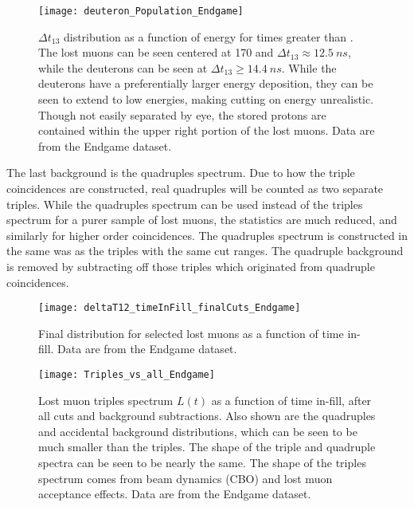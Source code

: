 \begin{figure}
    \centering
    \texttt{[image: deuteron\_Population\_Endgame]}
    \caption[Deuteron population at late times]{$\Delta t_{13}$ distribution as a function of energy for times greater than . The lost muons can be seen centered at 170 \MeV and $\Delta t_{13} \approx \SI{12.5}{ns}$, while the deuterons can be seen at $\Delta t_{13} \geq \SI{14.4}{ns}$. While the deuterons have a preferentially larger energy deposition, they can be seen to extend to low energies, making cutting on energy unrealistic. Though not easily separated by eye, the stored protons are contained within the upper right portion of the lost muons. Data are from the Endgame dataset.}
    \label{fig:deuteronPop}
\end{figure}


The last background is the quadruples spectrum. Due to how the triple coincidences are constructed, real quadruples will be counted as two separate triples. While the quadruples spectrum can be used instead of the triples spectrum for a purer sample of lost muons, the statistics are much reduced, and similarly for higher order coincidences. The quadruples spectrum is constructed in the same was as the triples with the same cut ranges. The quadruple background is removed by subtracting off those triples which originated from quadruple coincidences.


\begin{figure}
    \centering
    \texttt{[image: deltaT12\_timeInFill\_finalCuts\_Endgame]}
    \caption[Final \DT distribution for selected lost muons]{Final \DT distribution for selected lost muons as a function of time in-fill. Data are from the Endgame dataset.}
    \label{fig:finalDT12Dist}
\end{figure}

\begin{figure}
    \centering
    \texttt{[image: Triples\_vs\_all\_Endgame]}
    \caption[Lost muon triples spectrum compared to quadruples and accidental background]{Lost muon triples spectrum $L(t)$ as a function of time in-fill, after all cuts and background subtractions. Also shown are the quadruples and accidental background distributions, which can be seen to be much smaller than the triples. The shape of the triple and quadruple spectra can be seen to be nearly the same. The shape of the triples spectrum comes from beam dynamics (CBO) and lost muon acceptance effects. Data are from the Endgame dataset.}
    \label{fig:triples}
\end{figure}


